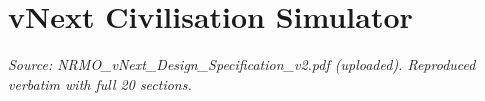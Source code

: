 \part{vNext Civilisation Simulator}
\noindent\textit{Source: NRMO\_vNext\_Design\_Specification\_v2.pdf
(uploaded). Reproduced verbatim with full 20 sections.}


